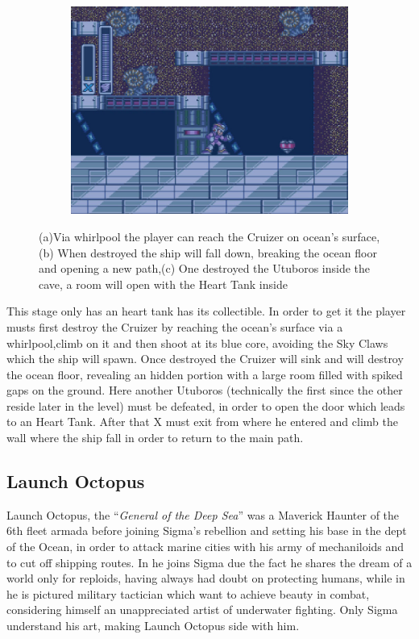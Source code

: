 \begin{figure}[h]
\begin{subfigure}{0.4\textwidth}
		\includegraphics[width=\linewidth]{figures/X1/Octopus_heart_3.jpg}
		\caption{}
	\end{subfigure}
	\caption{(a)Via whirlpool the player can reach the Cruizer on ocean's surface,(b) When destroyed the ship will fall down, breaking the ocean floor and opening a new path,(c) One destroyed the Utuboros inside the cave, a room will open with the Heart Tank inside}
\end{figure}
This stage only has an heart tank has its collectible. In order to get it the player musts first destroy the Cruizer by reaching the ocean's surface via a whirlpool,climb on it and then shoot at its blue core, avoiding the Sky Claws which the ship will spawn. Once destroyed the Cruizer will sink and will destroy the ocean floor, revealing an hidden portion with a large room filled with spiked gaps on the ground. Here another Utuboros (technically the first since the other reside later in the level) must be defeated, in order to open the door which leads to an Heart Tank. After that X must exit from where he entered and climb the wall where the ship fall in order to return to the main path.

\subsection{Launch Octopus}
Launch Octopus, the ``\textit{General of the Deep Sea}''\cite{book:MMX_Complete_art} was a Maverick Haunter of the 6th fleet armada before joining Sigma's rebellion and setting his base in the dept of the Ocean, in order to attack marine cities with his army of mechaniloids and to cut off shipping routes. In \x he joins Sigma due the fact he shares the dream of a world only for reploids, having always had doubt on protecting humans, while in \mhx he is pictured military tactician which want to achieve beauty in combat, considering himself an unappreciated artist of underwater fighting. Only Sigma understand his art, making Launch Octopus side with him\cite{wiki:MM_MHX_script}.

